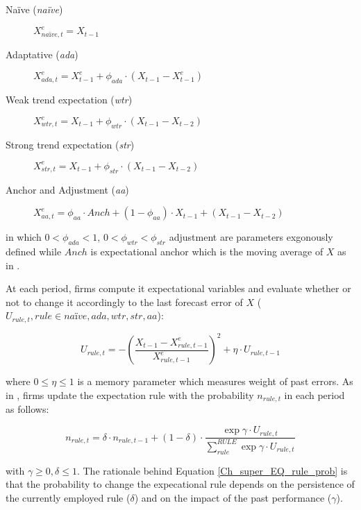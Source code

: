 \documentclass{SelfArx}
\begin{document}
\begin{description}
\item[{Naïve (\emph{naïve})}] \(X^{e}_{na\text{\"{i}}ve,t} = X_{t-1}\)
\item[{Adaptative (\emph{ada})}] \(X^{e}_{ada,t} = X^{e}_{t-1} + \phi_{ada}\cdot (X_{t-1} - X^{e}_{t-1})\)
\item[{Weak trend expectation (\emph{wtr})}] \(X^{e}_{wtr,t} = X_{t-1} + \phi_{wtr}\cdot (X_{t-1} - X_{t-2})\)
\item[{Strong trend expectation (\emph{str})}] \(X^{e}_{str,t} = X_{t-1} + \phi_{str}\cdot (X_{t-1} - X_{t-2})\)
\item[{Anchor and Adjustment (\emph{aa})}] \(X^{e}_{aa,t} = \phi_{aa}\cdot Anch + (1-\phi_{aa})\cdot X_{t-1} + (X_{t-1} - X_{t-2})\)
\end{description}

in which \(0 < \phi_{ada} < 1\), \(0 < \phi_{wtr} < \phi_{str}\) adjustment are parameters exgonously defined while \(Anch\) is expectational anchor which is the moving average of \(X\) as in \textcite{reissl_2021_Heterogeneous}.

At each period, firms compute it expectational variables and evaluate whether or not to change it accordingly to the last forecast error of \(X\) (\(U_{rule,t}, rule \in {na\text{\"i}ve}, ada, wtr, str, aa\)):
\begin{latex}
\begin{equation}
\label{Ch_super_EQ_LFE}
U_{rule,t} = - \left(\frac{X_{t-1} - X^{e}_{rule,t-1}}{X^{e}_{rule,t-1}}\right)^{2} + \eta\cdot U_{rule,t-1}
\end{equation}
\end{latex}
where \(0 \leq \eta \leq 1\) is a memory parameter which measures weight of past errors.
As in \textcite{dosi_2020_RATIONAL}, firms update the expectation rule with the probability \(n_{rule,t}\) in each period as follows:
\begin{latex}
\begin{equation}
\label{Ch_super_EQ_rule_prob}
n_{rule,t} = \delta\cdot n_{rule,t-1} + (1-\delta)\cdot \frac{\exp{\gamma\cdot U_{rule,t}}}{\sum_{rule}^{RULE}\exp{\gamma\cdot U_{rule,t}}}
\end{equation}
\end{latex}
with \(\gamma \geq 0, \delta \leq 1\).
The rationale behind Equation \ref{Ch_super_EQ_rule_prob} is that the probability to change the expecational rule depends on the persistence of the currently employed rule (\(\delta\)) and on the impact of the past performance (\(\gamma\)).
\end{document}
